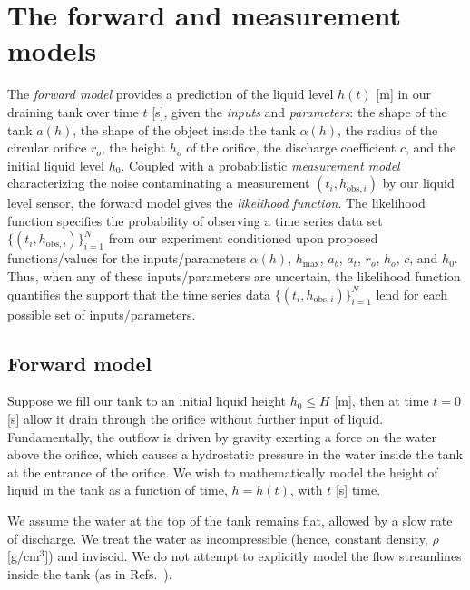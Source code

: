 \documentclass[openacc]{rsproca_new}%
\newcommand\thedata {$\{(t_i,h_{\text{obs}, i})\}_{i=1}^{N}$\xspace}
\begin{document}
\section{The forward and measurement models} \label{sec:forward_model}
The \emph{forward model} provides a prediction of the liquid level $h(t)$ [m] in our draining tank over time $t$ [s], given the \emph{inputs} and \emph{parameters}: the shape of the tank $a(h)$, the shape of the object inside the tank $\alpha(h)$, the radius of the circular orifice $r_o$, the height $h_o$ of the orifice, the discharge coefficient $c$, and the initial liquid level $h_0$. 
Coupled with a probabilistic \emph{measurement model} characterizing the noise contaminating a measurement $(t_i, h_{\text{obs}, i})$ by our liquid level sensor, the forward model gives the \emph{likelihood function}. The likelihood function specifies the probability of observing a time series data set \thedata from our experiment conditioned upon proposed functions/values for the inputs/parameters $\alpha(h)$, $h_{\text{max}}$, $a_b$, $a_t$, $r_o$, $h_o$, $c$, and $h_0$. Thus, when any of these inputs/parameters are uncertain, the likelihood function quantifies the support that the time series data \thedata lend for each possible set of inputs/parameters.

\subsection{Forward model}
Suppose we fill our tank to an initial liquid height $h_0 \leq H$ [m], then at time $t=0$ [s] allow it drain through the orifice without further input of liquid. Fundamentally, the outflow is driven by gravity exerting a force on the water above the orifice, which causes a hydrostatic pressure in the water inside the tank at the entrance of the orifice. 
We wish to mathematically model the height of liquid in the tank as a function of time, $h=h(t)$, with $t$ [s] time. 

We assume the water at the top of the tank remains flat, allowed by a slow rate of discharge. We treat the water as incompressible (hence, constant density, $\rho$ [g/cm$^3$]) and inviscid. We do not attempt to explicitly model the flow streamlines inside the tank (as in Refs.~\cite{mathew2014numerical,sakri2017numerical}). 
\end{document}
